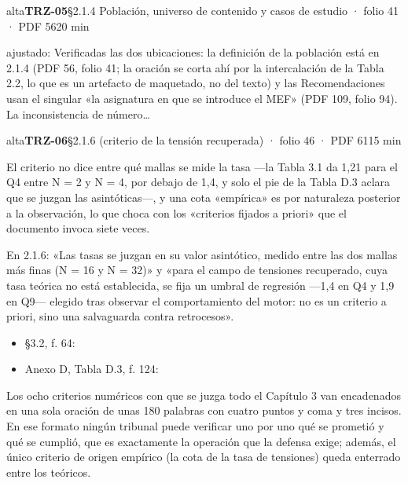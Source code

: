 \begin{ficha}{alta}{\casilla\textbf{TRZ-05}\quad{}\quad §2.1.4 Población, universo de contenido y casos de estudio · folio 41 · PDF 56\hfill 20 min}
{\footnotesize\color{gris}ajustado: Verificadas las dos ubicaciones: la definición de la población está en 2.1.4 (PDF 56, folio 41; la oración se corta ahí por la intercalación de la Tabla 2.2, lo que es un artefacto de maquetado, no del texto) y las Recomendaciones usan el singular «la asignatura en que se introduce el MEF» (PDF 109, folio 94). La inconsistencia de número…\par}
\end{ficha}
\begin{ficha}{alta}{\casilla\textbf{TRZ-06}\quad{}\quad §2.1.6 (criterio de la tensión recuperada) · folio 46 · PDF 61\hfill 15 min}
\par
{}El criterio no dice entre qué mallas se mide la tasa —la Tabla 3.1 da 1,21 para el Q4 entre N = 2 y N = 4, por debajo de 1,4, y solo el pie de la Tabla D.3 aclara que se juzgan las asintóticas—, y una cota «empírica» es por naturaleza posterior a la observación, lo que choca con los «criterios fijados a priori» que el documento invoca siete veces.\par
{}En 2.1.6: «Las tasas se juzgan en su valor asintótico, medido entre las dos mallas más finas (N = 16 y N = 32)» y «para el campo de tensiones recuperado, cuya tasa teórica no está establecida, se fija un umbral de regresión —1,4 en Q4 y 1,9 en Q9— elegido tras observar el comportamiento del motor: no es un criterio a priori, sino una salvaguarda contra retrocesos».\par
{}\begin{itemize}[leftmargin=1.2em,itemsep=1pt,topsep=1pt]
\item {\small §3.2, f. 64: }
\item {\small Anexo D, Tabla D.3, f. 124: }
\end{itemize}
{\small\color{gris}Los ocho criterios numéricos con que se juzga todo el Capítulo 3 van encadenados en una sola oración de unas 180 palabras con cuatro puntos y coma y tres incisos. En ese formato ningún tribunal puede verificar uno por uno qué se prometió y qué se cumplió, que es exactamente la operación que la defensa exige; además, el único criterio de origen empírico (la cota de la tasa de tensiones) queda enterrado entre los teóricos.\par}
\end{ficha}
